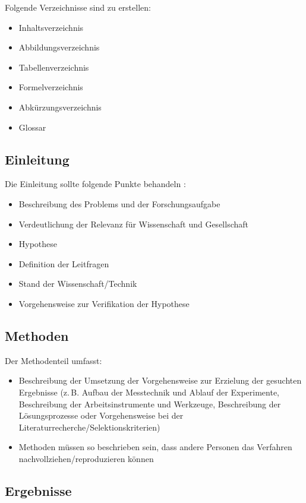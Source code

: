 Folgende Verzeichnisse sind zu erstellen:
\begin{itemize}
	\item Inhaltsverzeichnis
	\item Abbildungsverzeichnis
	\item Tabellenverzeichnis
	\item Formelverzeichnis
	\item Abkürzungsverzeichnis
	\item Glossar
\end{itemize}

\subsection*{Einleitung}
\label{subsec:einleitung_struktur}

Die Einleitung sollte folgende Punkte behandeln \parencite{reiter2011,theisen2013}:
\begin{itemize}
	\item Beschreibung des Problems und der Forschungsaufgabe
	\item Verdeutlichung der Relevanz für Wissenschaft und Gesellschaft
	\item Hypothese
	\item Definition der Leitfragen
	\item Stand der Wissenschaft/Technik
	\item Vorgehensweise zur Verifikation der Hypothese
\end{itemize}

\subsection*{Methoden}
\label{subsec:methoden_struktur}

Der Methodenteil umfasst:
\begin{itemize}
	\item Beschreibung der Umsetzung der Vorgehensweise zur Erzielung der gesuchten Ergebnisse (z.\,B. Aufbau der Messtechnik und Ablauf der Experimente, Beschreibung der Arbeitsinstrumente und Werkzeuge, Beschreibung der Lösungsprozesse oder Vorgehensweise bei der Literaturrecherche/Selektionskriterien)
	\item Methoden müssen so beschrieben sein, dass andere Personen das Verfahren nachvollziehen/reproduzieren können
\end{itemize}

\subsection*{Ergebnisse}
\label{subsec:ergebnisse_struktur}

